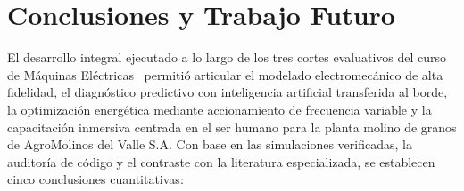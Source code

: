 
\section{Conclusiones y Trabajo Futuro}\label{sec:conclusiones}

El desarrollo integral ejecutado a lo largo de los tres cortes evaluativos del
curso de M\'aquinas El\'ectricas~\cite{GuiaProyecto2026} permiti\'o articular
el modelado electromec\'anico de alta fidelidad, el diagn\'ostico predictivo
con inteligencia artificial transferida al borde, la optimizaci\'on
energ\'etica mediante accionamiento de frecuencia variable y la capacitaci\'on
inmersiva centrada en el ser humano para la planta molino de granos de
AgroMolinos del Valle S.A. Con base en las simulaciones verificadas, la
auditor\'ia de c\'odigo y el contraste con la literatura especializada, se
establecen cinco conclusiones cuantitativas:

